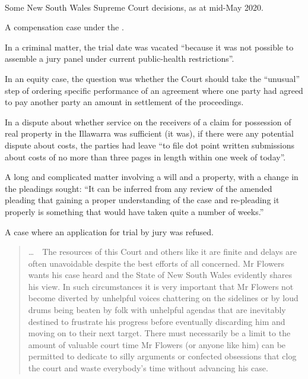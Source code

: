 
\printlawciteindexes
\bigskip
\hfill{}\hfill\ %
\bigskip


\newpage
\noindent Some New South Wales Supreme Court decisions, as at mid-May 2020.
\bigskip

\p A compensation case under the . 

\p In a criminal matter, the trial date was vacated ``because it was not possible to assemble a jury panel under current public-health restrictions''.

\p In an equity case, the question was whether the Court should take the ``unusual'' step of ordering specific performance of an agreement where one party had agreed to pay another party an amount in settlement of the proceedings.




\setnumparshiftleft{\hspace{-2.5em}}
\setnumparfillright{\hspace{3.5em}}
\setnumparformat{\color{blue}\bfseries}
\setnumpardelimleft{}
\p In a dispute about whether service on the receivers of a claim for possession of real property in the Illawarra was sufficient (it was), if there were any potential dispute about costs, the parties had leave ``to file dot point written submissions about costs of no more than three pages in length within one week of today''.

\p A long and complicated matter involving a will and a property, with a change in the pleadings sought: ``It can be inferred from any review of the amended pleading that gaining a proper understanding of the case and re-pleading it properly is something that would have taken quite a number of weeks.''

\p A case where an application for trial by jury was refused.
\begin{quotation}
\ldots\ \  The resources of this Court and others like it are finite and delays are often unavoidable despite the best efforts of all concerned. Mr Flowers wants his case heard and the State of New South Wales evidently shares his view. In such circumstances it is very important that Mr Flowers not become diverted by unhelpful voices chattering on the sidelines or by loud drums being beaten by folk with unhelpful agendas that are inevitably destined to frustrate his progress before eventually discarding him and moving on to their next target. There must necessarily be a limit to the amount of valuable court time Mr Flowers (or anyone like him) can be permitted to dedicate to silly arguments or confected obsessions that clog the court and waste everybody’s time without advancing his case.
\end{quotation}


